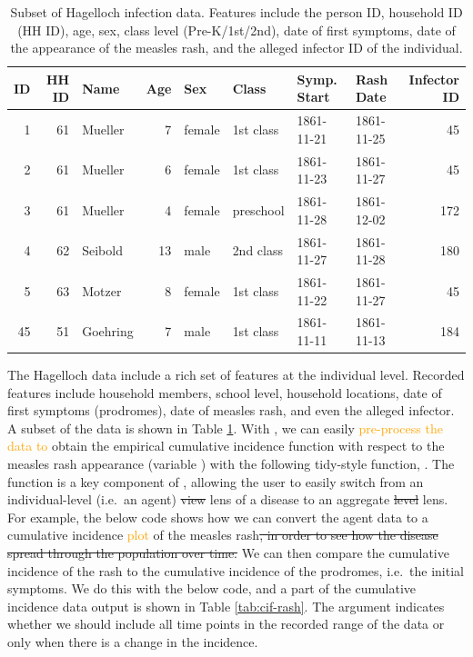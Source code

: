 \documentclass[
  shortnames]{jss}
\begin{document}
\begin{CodeChunk}
\begin{table}[!h]

\caption{\label{tab:hags-people}Subset of Hagelloch infection data.  Features include the person ID, household ID (HH ID), age, sex, class level (Pre-K/1st/2nd), date of first symptoms, date of the appearance of the measles rash, and the alleged infector ID of the individual.}
\centering
\begin{tabular}[t]{rrlrllllr}
\toprule
ID & HH ID & Name & Age & Sex & Class & Symp. Start & Rash Date & Infector ID\\
\midrule
1 & 61 & Mueller & 7 & female & 1st class & 1861-11-21 & 1861-11-25 & 45\\
2 & 61 & Mueller & 6 & female & 1st class & 1861-11-23 & 1861-11-27 & 45\\
3 & 61 & Mueller & 4 & female & preschool & 1861-11-28 & 1861-12-02 & 172\\
4 & 62 & Seibold & 13 & male & 2nd class & 1861-11-27 & 1861-11-28 & 180\\
5 & 63 & Motzer & 8 & female & 1st class & 1861-11-22 & 1861-11-27 & 45\\
45 & 51 & Goehring & 7 & male & 1st class & 1861-11-11 & 1861-11-13 & 184\\
\bottomrule
\end{tabular}
\end{table}

\end{CodeChunk}

The Hagelloch data include a rich set of features at the individual
level. Recorded features include household members, school level,
household locations, date of first symptoms (prodromes), date of measles
rash, and even the alleged infector. A subset of the data is shown in
Table \ref{tab:hags-people}. With , we can easily
\textcolor{orange}{pre-process the data to} obtain the empirical
cumulative incidence function with respect to the measles rash
appearance (variable ) with the following tidy-style function,
. The function 
is a key component of , allowing the user to easily
switch from an individual-level (i.e.~an agent) \sout{view} lens of a
disease to an aggregate \sout{level} lens. For example, the below code
shows how we can convert the agent data to a cumulative incidence
\textcolor{orange}{plot} of the measles
rash\sout{, in order to see how the disease spread through the population over time.}
We can then compare the cumulative incidence of the rash to the
cumulative incidence of the prodromes, i.e.~the initial symptoms. We do
this with the below code, and a part of the cumulative incidence data
output is shown in Table \ref{tab:cif-rash}. The argument
 indicates whether we should include all
time points in the recorded range of the data or only when there is a
change in the incidence.
\end{document}
